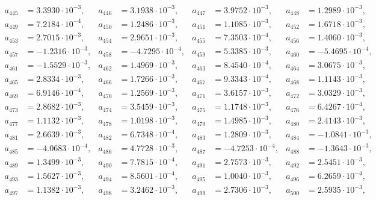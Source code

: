 \begin{align*}
a_{ 445 } &= 3.3930 \cdot 10^{ -3 }, & a_{ 446 } &= 3.1938 \cdot 10^{ -3 }, & a_{ 447 } &= 3.9752 \cdot 10^{ -3 }, & a_{ 448 } &= 1.2989 \cdot 10^{ -3 },\\ 
a_{ 449 } &= 7.2184 \cdot 10^{ -4 }, & a_{ 450 } &= 1.2486 \cdot 10^{ -3 }, & a_{ 451 } &= 1.1085 \cdot 10^{ -3 }, & a_{ 452 } &= 1.6718 \cdot 10^{ -3 },\\ 
a_{ 453 } &= 2.7015 \cdot 10^{ -3 }, & a_{ 454 } &= 2.9651 \cdot 10^{ -3 }, & a_{ 455 } &= 7.3503 \cdot 10^{ -4 }, & a_{ 456 } &= 1.4060 \cdot 10^{ -3 },\\ 
a_{ 457 } &= -1.2316 \cdot 10^{ -3 }, & a_{ 458 } &= -4.7295 \cdot 10^{ -4 }, & a_{ 459 } &= 5.3385 \cdot 10^{ -3 }, & a_{ 460 } &= -5.4695 \cdot 10^{ -4 },\\ 
a_{ 461 } &= -1.5529 \cdot 10^{ -3 }, & a_{ 462 } &= 1.4969 \cdot 10^{ -3 }, & a_{ 463 } &= 8.4540 \cdot 10^{ -4 }, & a_{ 464 } &= 3.0675 \cdot 10^{ -3 },\\ 
a_{ 465 } &= 2.8334 \cdot 10^{ -3 }, & a_{ 466 } &= 1.7266 \cdot 10^{ -3 }, & a_{ 467 } &= 9.3343 \cdot 10^{ -4 }, & a_{ 468 } &= 1.1143 \cdot 10^{ -3 },\\ 
a_{ 469 } &= 6.9146 \cdot 10^{ -4 }, & a_{ 470 } &= 1.2569 \cdot 10^{ -3 }, & a_{ 471 } &= 3.6157 \cdot 10^{ -3 }, & a_{ 472 } &= 3.0329 \cdot 10^{ -3 },\\ 
a_{ 473 } &= 2.8682 \cdot 10^{ -3 }, & a_{ 474 } &= 3.5459 \cdot 10^{ -3 }, & a_{ 475 } &= 1.1748 \cdot 10^{ -3 }, & a_{ 476 } &= 6.4267 \cdot 10^{ -4 },\\ 
a_{ 477 } &= 1.1132 \cdot 10^{ -3 }, & a_{ 478 } &= 1.0198 \cdot 10^{ -3 }, & a_{ 479 } &= 1.4985 \cdot 10^{ -3 }, & a_{ 480 } &= 2.4143 \cdot 10^{ -3 },\\ 
a_{ 481 } &= 2.6639 \cdot 10^{ -3 }, & a_{ 482 } &= 6.7348 \cdot 10^{ -4 }, & a_{ 483 } &= 1.2809 \cdot 10^{ -3 }, & a_{ 484 } &= -1.0841 \cdot 10^{ -3 },\\ 
a_{ 485 } &= -4.0683 \cdot 10^{ -4 }, & a_{ 486 } &= 4.7728 \cdot 10^{ -3 }, & a_{ 487 } &= -4.7253 \cdot 10^{ -4 }, & a_{ 488 } &= -1.3643 \cdot 10^{ -3 },\\ 
a_{ 489 } &= 1.3499 \cdot 10^{ -3 }, & a_{ 490 } &= 7.7815 \cdot 10^{ -4 }, & a_{ 491 } &= 2.7573 \cdot 10^{ -3 }, & a_{ 492 } &= 2.5451 \cdot 10^{ -3 },\\ 
a_{ 493 } &= 1.5627 \cdot 10^{ -3 }, & a_{ 494 } &= 8.5601 \cdot 10^{ -4 }, & a_{ 495 } &= 1.0040 \cdot 10^{ -3 }, & a_{ 496 } &= 6.2659 \cdot 10^{ -4 },\\ 
a_{ 497 } &= 1.1382 \cdot 10^{ -3 }, & a_{ 498 } &= 3.2462 \cdot 10^{ -3 }, & a_{ 499 } &= 2.7306 \cdot 10^{ -3 }, & a_{ 500 } &= 2.5935 \cdot 10^{ -3 },\\ 

\end{align*}
